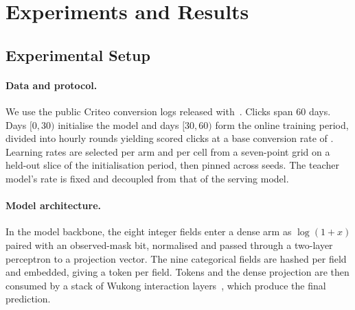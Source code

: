 \section{Experiments and Results}
\label{sec:exp}

\subsection{Experimental Setup}


\paragraph{Data and protocol.} We use the public Criteo conversion logs released
with~\cite{chapelle2014modeling}. Clicks span 60 days. Days $[0,30)$ initialise the model and days
$[30,60)$ form the online training period, divided into \nCohorts{} hourly rounds yielding
\nEval{} scored clicks at a base conversion rate of \baseRate{}. Learning rates are selected per arm and
per cell from a seven-point grid on a held-out slice of the initialisation period, then pinned across seeds. The teacher model's rate is fixed and decoupled from
that of the serving model.

\paragraph{Model architecture.} In the model backbone, the eight integer fields enter a dense
arm as $\log(1+x)$ paired with an observed-mask bit, normalised and passed through a two-layer
perceptron to a projection vector. The nine categorical fields are hashed per field and
embedded, giving a token per field. Tokens and the dense projection
are then consumed by a stack of Wukong interaction layers~\cite{zhang2024wukong}, which
produce the final prediction.

